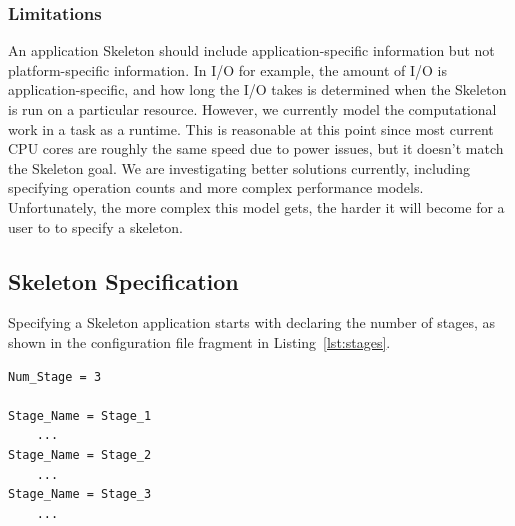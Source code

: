 \documentclass{sig-alternate}
\begin{document}
\subsubsection*{Limitations} An application Skeleton should include application-specific information but not platform-specific information.  In I/O for example, the amount of I/O is  application-specific, and how long the I/O takes is determined when the Skeleton is run on a particular resource.
However, we currently model the computational work in a task as a runtime.  This is reasonable at this point since most current CPU cores are roughly the same speed due to power issues, but
it doesn't match the Skeleton goal.  We are investigating better solutions currently, including specifying operation counts and more complex performance models.  Unfortunately, the more complex this model gets, the harder it will become for a user to to specify a skeleton.

\subsection{Skeleton Specification} \label{sec:programming}

Specifying a Skeleton application starts with declaring the number of stages, as shown in the configuration file fragment in Listing~\ref{lst:stages}. 

\begin{lstlisting}[caption=Declaring Number of Stages, label=lst:stages, linewidth=1.0\textwidth, xleftmargin=2.5ex]
Num_Stage = 3

Stage_Name = Stage_1
    ...
Stage_Name = Stage_2
    ...
Stage_Name = Stage_3
    ...
\end{lstlisting}
\end{document}
